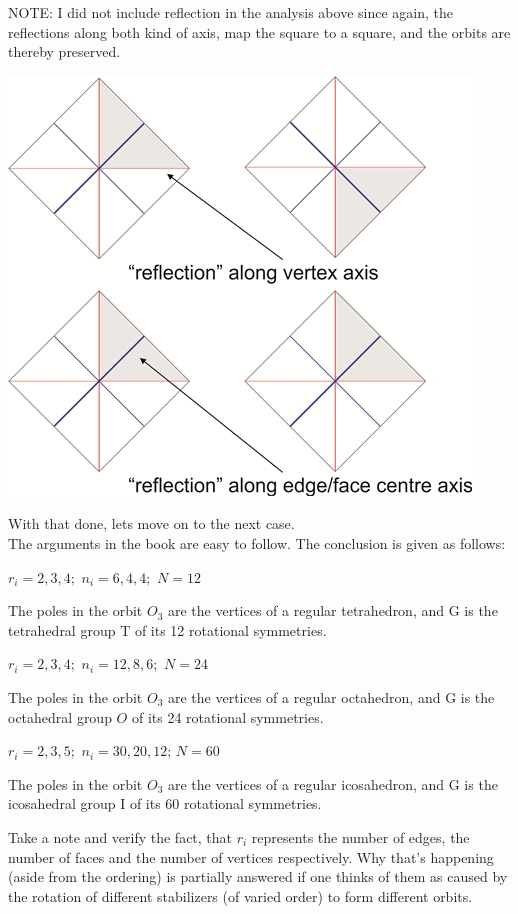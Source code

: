 \par
NOTE: I did not include reflection in the analysis above since again, the reflections along both kind of axis, map the square to a square, and the orbits are thereby preserved.\\
\begin{center}
\includegraphics[width=0.4\linewidth]{Chapter_6_images/square_reflections.jpg}
\end{center}
\vspace{40pt}
With that done, lets move on to the next case.\\
The arguments in the book are easy to follow. The conclusion is given as follows:
\begin{aenumerate}
\item $r_{i}=2,3,4;\,\,n_{i}=6,4,4;\,\,N=12$
\par
The poles in the orbit $O_{3}$ are the vertices of a regular tetrahedron, and G is the tetrahedral group T of its 12 rotational symmetries.
\item $r_{i}=2,3,4;\,\,n_{i}=12,8,6;\,\,N=24$
\par
The poles in the orbit $O_{3}$ are the vertices of a regular octahedron, and G is the octahedral group $O$ of its 24 rotational symmetries.
\item $r_{i}=2,3,5;\,\,n_{i}=30,20,12;\,N=60$
\par
The poles in the orbit $O_{3}$ are the vertices of a regular icosahedron, and G is the icosahedral group I of its 60 rotational symmetries.\\
\par
Take a note and verify the fact, that $r_{i}$ represents the number of edges, the number of faces and the number of vertices respectively. Why that's happening (aside from the ordering) is partially answered if one thinks of them as caused by the rotation of different stabilizers (of varied order) to form different orbits.\\
\end{aenumerate}
\par

